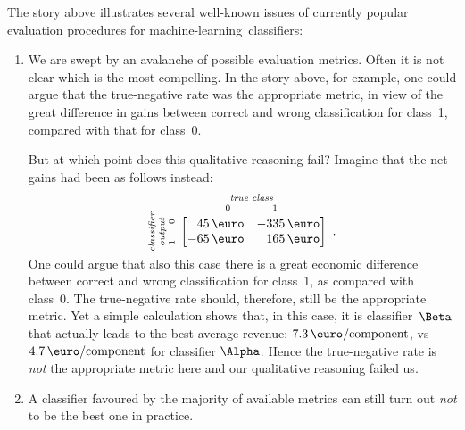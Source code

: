 \documentclass[\ifafour a4paper,12pt,\else a5paper,10pt,\fi%
onecolumn,oneside,article,%
british%
]{memoir}
\theoremstyle{remark}
\theoremstyle{innote}
\renewcommand*{\|}[1][]{\nonscript\:#1\vert\nonscript\:\mathopen{}}
\newcommand*{\ml}{machine-learning}
\newcommand*{\umatrix}[4]{\begin{bmatrix*}[r]#1&#2\\#3&#4\end{bmatrix*}}
\begin{document}
The story above illustrates several well-known issues of currently popular evaluation procedures for \ml\ classifiers:
\begin{enumerate}%
\item We are swept by an avalanche of possible evaluation metrics. Often it is not clear which is the most compelling. In the story above, for example, one could argue that the true-negative rate was the appropriate metric, in view of the great difference in gains between correct and wrong classification for class~1, compared with that for class~0.

  But at which point does this qualitative reasoning fail? Imagine that the net gains had been as follows instead:
\begin{equation}
  \label{eq:utility_example_2}
  \rotatebox[origin=c]{90}{
    \clap{\textit{\parbox{5em}{\centering\scriptsize classifier\\output\\$1\hspace{1.5em}0$}}
    }}\ 
  \overbracket[0pt]{
    \umatrix{
        45\,\text{\texteuro} }{ -335\,\text{\texteuro} }{
        -65\,\text{\texteuro} }{ 165\,\text{\texteuro}
      }}^{
      \clap{\textit{\parbox{6em}{\centering\scriptsize true class\\$0\hspace{4em}1$}}
    }} \ .
\end{equation}
One could argue that also this case there is a great economic difference between correct and wrong classification for class~1, as compared with class~0. The true-negative rate should, therefore, still be the appropriate metric. Yet a simple calculation shows that, in this case, it is classifier~$\Beta$ that actually leads to the best average revenue: $7.3\,\text{\texteuro/component}$, vs $4.7\,\text{\texteuro/component}$ for classifier $\Alpha$. Hence the true-negative rate is \emph{not} the appropriate metric here and our qualitative reasoning failed us.


\item A classifier favoured by the majority of available metrics can still turn out \emph{not} to be the best one in practice.


\end{enumerate}
\end{document}
